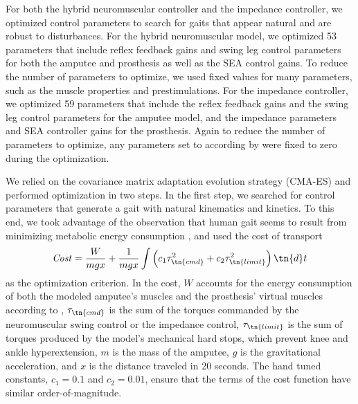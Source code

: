 For both the hybrid neuromuscular controller and the impedance controller, we
optimized control parameters to search for gaits that appear natural and are
robust to disturbances. For the hybrid neuromuscular model, we optimized 53
parameters that include reflex feedback gains and swing leg control parameters
for both the amputee and prosthesis as well as the SEA control gains. To reduce
the number of parameters to optimize, we used fixed values for many parameters,
such as the muscle properties and prestimulations. For the impedance controller,
we optimized 59 parameters that include the reflex feedback gains and the swing
leg control parameters for the amputee model, and the impedance parameters and
SEA controller gains for the prosthesis. Again to reduce the number of
parameters to optimize, any parameters set to according by \citet{sup2008design}
were fixed to zero during the optimization. 

We relied on the covariance matrix adaptation evolution strategy (CMA-ES)
\citep{hansen2006cma} and performed optimization in two steps. In the first step,
we searched for control parameters that generate a gait with natural kinematics
and kinetics. To this end, we took advantage of the observation that human gait
seems to result from minimizing metabolic energy consumption
\citep{mcneill2002energetics}, and used the cost of transport 
\begin{align}
    \mathit{Cost} = \frac{W}{mgx} + \frac{1}{mgx} \int \left( 
        c_1\tau_\tn{cmd}^2  + c_2 \tau_\tn{limit}^2 \right) \tn{d}t
    \label{eq:costfuncenergy}
\end{align}
as the optimization criterion. In the cost, $W$ accounts for the energy consumption
of both the modeled amputee's muscles and the prosthesis' virtual muscles
according to \citet{umberger2003model}, $\tau_\tn{cmd}$ is the sum of the
torques commanded by the neuromuscular swing control or the impedance control,
$\tau_\tn{limit}$ is the sum of torques produced by the model's mechanical
hard stops, which prevent knee and ankle hyperextension, $m$ is the mass of the
amputee, $g$ is the gravitational acceleration, and $x$ is the distance
traveled in 20 seconds. The hand tuned constants, $c_1 = 0.1$ and $c_2 = 0.01$,
ensure that the terms of the cost function have similar order-of-magnitude. 


